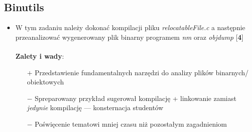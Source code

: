 \documentclass[12pt]{article}
\begin{document}
\subsection{Binutils}
\begin{itemize}
\item W tym zadaniu należy dokonać kompilacji pliku \textit{relocatableFile.c} a
  następnie przeanalizować wygenerowany plik binarny programem \textit{nm} oraz
  \textit{objdump} [\textbf{4}]\\ \\
  \textbf{Zalety i wady}:
  \begin{itemize}
  \item[$+$] Przedstawienie fundamentalnych narzędzi do analizy plików
    binarnych/ obiektowych
  \item[$-$] Spreparowany przykład sugerował kompilację + linkowanie zamiast
    \textit{jedynie} kompilację --- konsternacja studentów
  \item[$-$] Poświęcenie tematowi mniej czasu niż pozostałym zagadnieniom
  \end{itemize}

\end{itemize}
\end{document}
